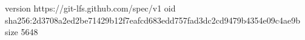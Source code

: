 version https://git-lfs.github.com/spec/v1
oid sha256:2d3708a2ed2be71429b12f7eafcd683edd757fad3dc2cd9479b4354e09c4ae9b
size 5648
